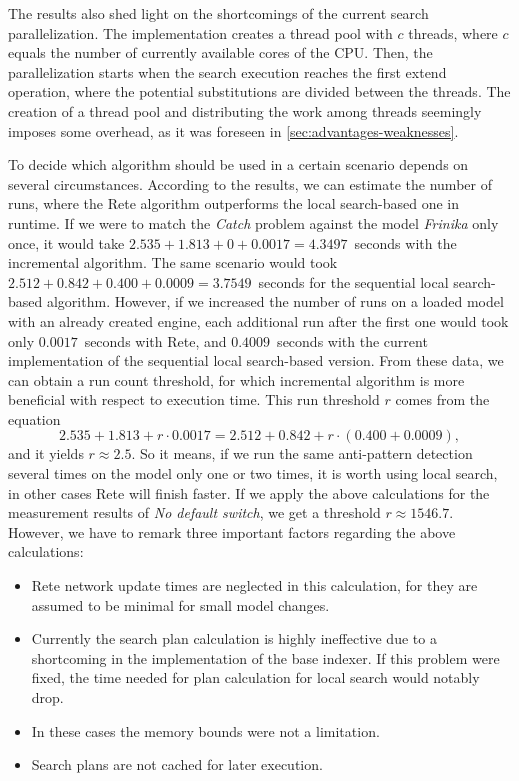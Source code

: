 The results also shed light on the shortcomings of the current search parallelization. The implementation creates a thread pool with $c$ threads, where $c$ equals the number of currently available cores of the CPU. Then, the parallelization starts when the search execution reaches the first extend operation, where the potential substitutions are divided between the threads. The creation of a thread pool and distributing the work among threads seemingly imposes some overhead, as it was foreseen in \autoref{sec:advantages-weaknesses}. 


To decide which algorithm should be used in a certain scenario depends on several circumstances. According to the results, we can estimate the number of runs, where the Rete algorithm outperforms the local search-based one in runtime. If we were to match the \emph{Catch} problem against the model \emph{Frinika} only once, it would take $2.535 + 1.813 + 0 + 0.0017 = 4.3497$~seconds with the incremental algorithm. The same scenario would took $ 2.512 + 0.842 + 0.400 + 0.0009 = 3.7549 $~seconds for the sequential local search-based algorithm. However, if we increased the number of runs on a loaded model with an already created engine, each additional run after the first one would took only $ 0.0017 $~seconds with Rete, and $ 0.4009 $~seconds with the current implementation of the sequential local search-based version. From these data, we can obtain a run count threshold, for which incremental algorithm is more beneficial with respect to execution time. This run threshold $r$ comes from the equation 
$$ 2.535 + 1.813 + r \cdot 0.0017 = 2.512 + 0.842 + r \cdot (0.400 + 0.0009), $$
and it yields $ r \approx 2.5 $. So it means, if we run the same anti-pattern detection several times on the model only one or two times, it is worth using local search, in other cases Rete will finish faster. If we apply the above calculations for the measurement results of \emph{No default switch}, we get a threshold $r \approx 1546.7$. However, we have to remark three important factors regarding the above calculations:

\begin{itemize}
	\item Rete network update times are neglected in this calculation, for they are assumed to be minimal for small model changes.
	\item Currently the search plan calculation is highly ineffective due to a shortcoming in the implementation of the base indexer. If this problem were fixed, the time needed for plan calculation for local search would notably drop.
	\item In these cases the memory bounds were not a limitation.
	\item Search plans are not cached for later execution.
\end{itemize}

